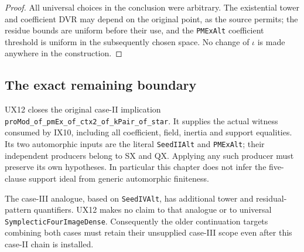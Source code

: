 \begin{proof}
All universal choices in the conclusion
were arbitrary.  The existential tower
and coefficient DVR may depend on the
original point, as the source permits;
the residue bounds are uniform before
their use, and the \texttt{PMExAlt}
coefficient threshold is uniform in
the subsequently chosen space.
No change of $\iota$ is made anywhere
in the construction.
\end{proof}

\subsection{The exact remaining boundary}

UX12 closes the original case-II implication
\texttt{proMod\_of\_pmEx\_of\_ctx2\_of\_kPair\_of\_star}.
It supplies the actual witness consumed by IX10,
including all coefficient, field, inertia and
support equalities.  Its two automorphic inputs
are the literal \texttt{SeedIIAlt} and
\texttt{PMExAlt}; their independent producers
belong to SX and QX.  Applying any such producer
must preserve its own hypotheses.  In particular
this chapter does not infer the five-clause
support ideal from generic automorphic finiteness.

The case-III analogue, based on
\texttt{SeedIVAlt}, has additional tower and
residual-pattern quantifiers.  UX12 makes no
claim to that analogue or to universal
\texttt{SymplecticFourImageDense}.  Consequently
the older continuation targets combining both
cases must retain their unsupplied case-III
scope even after this case-II chain is installed.

